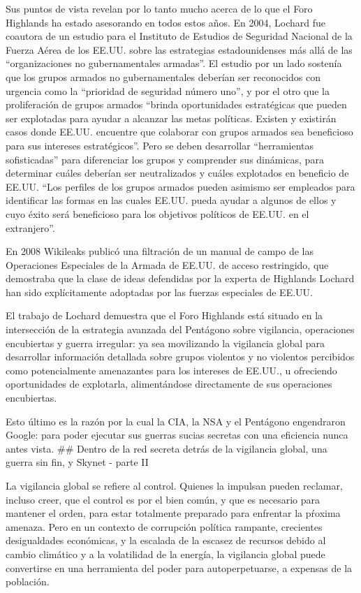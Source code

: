 \documentclass[10pt,a5paper,twoside,spanish,]{book}
\begin{document}
Sus puntos de vista revelan por lo tanto mucho acerca de lo que el Foro
Highlands ha estado asesorando en todos estos años. En 2004, Lochard fue
coautora de un estudio para el Instituto de Estudios de Seguridad
Nacional de la Fuerza Aérea de los EE.UU. sobre las estrategias
estadounidenses más allá de las ``organizaciones no gubernamentales
armadas''. El estudio por un lado sostenía que los grupos armados no
gubernamentales deberían ser reconocidos con urgencia como la
``prioridad de seguridad número uno'', y por el otro que la
proliferación de grupos armados ``brinda oportunidades estratégicas que
pueden ser explotadas para ayudar a alcanzar las metas políticas.
Existen y existirán casos donde EE.UU. encuentre que colaborar con
grupos armados sea beneficioso para sus intereses estratégicos''. Pero
se deben desarrollar ``herramientas sofisticadas'' para diferenciar los
grupos y comprender sus dinámicas, para determinar cuáles deberían ser
neutralizados y cuáles explotados en beneficio de EE.UU. ``Los perfiles
de los grupos armados pueden asimismo ser empleados para identificar las
formas en las cuales EE.UU. pueda ayudar a algunos de ellos y cuyo éxito
será beneficioso para los objetivos políticos de EE.UU. en el
extranjero''.

En 2008 Wikileaks publicó una filtración de un manual de campo de las
Operaciones Especiales de la Armada de EE.UU. de acceso restringido, que
demostraba que la clase de ideas defendidas por la experta de Highlands
Lochard han sido explícitamente adoptadas por las fuerzas especiales de
EE.UU.

El trabajo de Lochard demuestra que el Foro Highlands está situado en la
intersección de la estrategia avanzada del Pentágono sobre vigilancia,
operaciones encubiertas y guerra irregular: ya sea movilizando la
vigilancia global para desarrollar información detallada sobre grupos
violentos y no violentos percibidos como potencialmente amenazantes para
los intereses de EE.UU., u ofreciendo oportunidades de explotarla,
alimentándose directamente de sus operaciones encubiertas.

Esto último es la razón por la cual la CIA, la NSA y el Pentágono
engendraron Google: para poder ejecutar sus guerras sucias secretas con
una eficiencia nunca antes vista. \#\# Dentro de la red secreta detrás
de la vigilancia global, una guerra sin fin, y Skynet - parte II

La vigilancia global se refiere al control. Quienes la impulsan pueden
reclamar, incluso creer, que el control es por el bien común, y que es
necesario para mantener el orden, para estar totalmente preparado para
enfrentar la pŕoxima amenaza. Pero en un contexto de corrupción política
rampante, crecientes desigualdades económicas, y la escalada de la
escasez de recursos debido al cambio climático y a la volatilidad de la
energía, la vigilancia global puede convertirse en una herramienta del
poder para autoperpetuarse, a expensas de la población.
\end{document}
